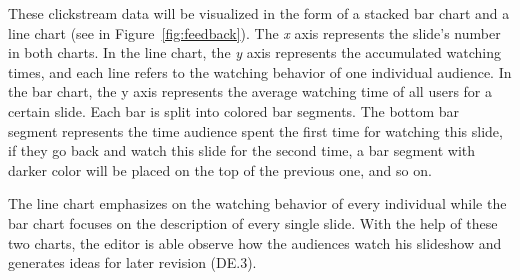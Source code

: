 These clickstream data will be visualized in the form of a stacked bar chart and a line chart (see in Figure~\ref{fig:feedback}).  
The \textit{x} axis represents the slide's number in both charts. In the line chart, the \textit{y} axis represents the accumulated watching times, and each line refers to the watching behavior of one individual audience. In the bar chart, the y axis represents the average watching time of all users for a certain slide. Each bar is split into colored bar segments. The bottom bar segment represents the time audience spent the first time for watching this slide, if they go back and watch this slide for the second time, a bar segment with darker color will be placed on the top of the previous one, and so on. 

The line chart emphasizes on the watching behavior of every individual while the bar chart focuses on the description of every single slide.  
With the help of these two charts, the editor is able observe how the audiences watch his slideshow and generates ideas for later revision (DE.3). 

